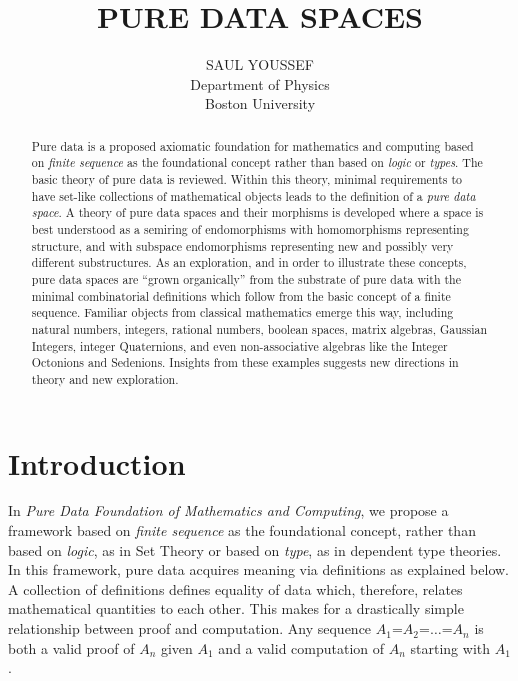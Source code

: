 \documentclass[11pt]{article}
\begin{document}
\title{\bf {PURE DATA SPACES}}
\author{%
  SAUL YOUSSEF%
  \hfil \\
  Department of Physics \\
  Boston University \\
}
\maketitle
\begin{abstract}
Pure data is a proposed axiomatic foundation for mathematics and computing based on {\it finite sequence} as 
the foundational concept rather than based on {\it logic} or {\it types}.  The basic theory of pure data is reviewed.  
Within this theory, minimal requirements to have set-like collections of mathematical objects leads to the definition 
of a {\it pure data space}.  A theory of pure data spaces and their morphisms is developed where a space is best 
understood as a semiring of endomorphisms with homomorphisms representing structure, and with subspace 
endomorphisms representing new and possibly very different substructures.  
As an exploration, and in order to illustrate these concepts, pure data spaces are 
``grown organically'' from the substrate of pure data with the minimal combinatorial definitions which follow from 
the basic concept of a finite sequence.  Familiar objects from classical mathematics emerge this way,   
including natural numbers, integers, rational numbers, boolean spaces, matrix algebras, Gaussian Integers, 
integer Quaternions, and even non-associative algebras like the Integer Octonions and Sedenions.  
Insights from these examples suggests new directions in theory and new exploration. 
\end{abstract}

\theoremstyle{definition}
\newtheorem{axiom}{Axiom}
\newtheorem*{axiom*}{Axiom}
\newtheorem*{fact}{Fact}
\newtheorem{theorem}{Theorem}[section]
\newtheorem{lemma}{Lemma}
\newtheorem{corollary}[theorem]{Corollary}

\newtheorem{definition}{Definition}

\newtheorem*{remark}{}

\section{Introduction}

    In {\it Pure Data Foundation of Mathematics and Computing}\cite{PDF}, we propose a framework based on {\it finite sequence} as the foundational concept, rather than based on {\it logic}, as in Set Theory or 
based on {\it type}, as in dependent type theories.  In this framework, pure data acquires meaning via definitions as 
explained below.  A collection of definitions defines equality of data which, therefore, relates mathematical quantities to 
each other.  This makes for a drastically simple relationship between proof and computation.   
Any sequence $A_1$=$A_2$=$\dots$=$A_n$ is both a valid proof of $A_n$ given $A_1$ and a valid computation 
of $A_n$ starting with $A_1$.  
\end{document}
